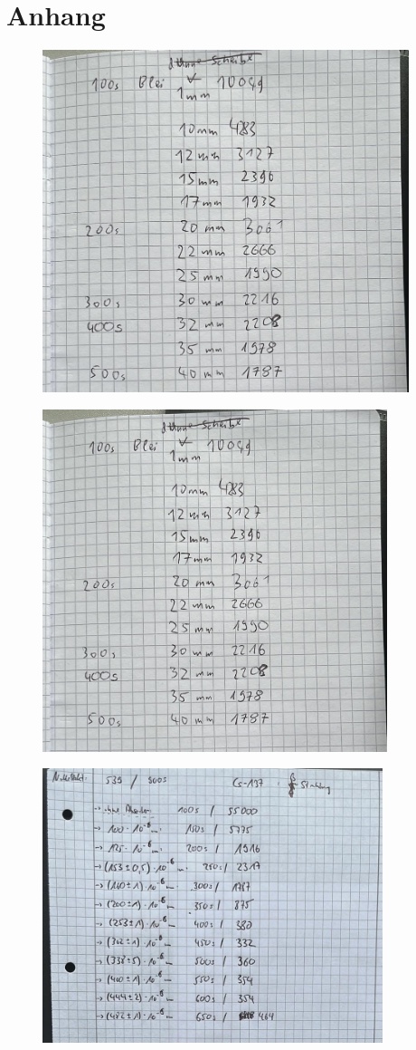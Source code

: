 \section{Anhang}

\begin{figure}[H]
    \centering
    \includegraphics[height=100mm]{bilder/Ah1.jpeg}
\end{figure}


\begin{figure}[H]
    \centering
    \includegraphics[height=100mm]{bilder/Ah2.jpeg}
\end{figure}


\begin{figure}[H]
    \centering
    \includegraphics[height=80mm]{bilder/Ah3.jpeg}
\end{figure}